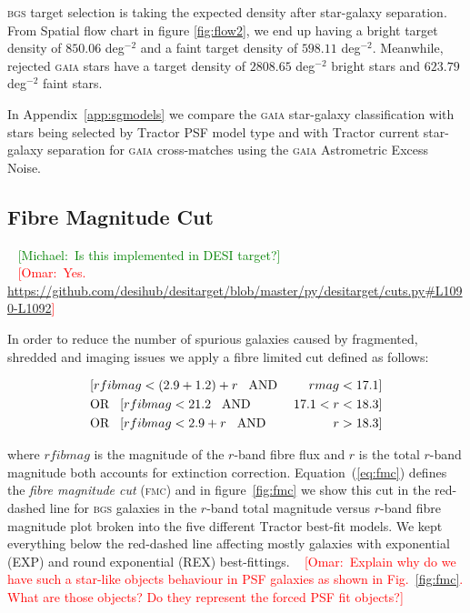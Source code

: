 \documentclass[fleqn,usenatbib]{mnras}
\newcommand{\mike}[1]{~\newline\noindent \textcolor{Green}{{ [Michael:~{#1}]\\}}}
\newcommand{\omar}[1]{~\newline\noindent \textcolor{red}{{ [Omar:~{#1}]\\}}}
\newcommand{\BGS}{\textsc{bgs}\xspace}
\newcommand{\FMC}{{\textsc{fmc}}\xspace}
\newcommand{\GAIA}{\textsc{gaia}\xspace}
\newcommand{\TRACTOR}{\textsc{T}ractor\xspace}
\begin{document}
\BGS target selection is taking the expected density after star-galaxy separation. From Spatial flow chart in figure \ref{fig:flow2}, we end up having a bright target density of $850.06$ deg$^{-2}$ and a faint target density of $598.11$ deg$^{-2}$. Meanwhile, rejected \GAIA stars have a target density of $2808.65$ deg$^{-2}$ bright stars and $623.79$ deg$^{-2}$ faint stars.

In Appendix~\ref{app:sgmodels} we compare the \GAIA star-galaxy classification with stars being selected by \TRACTOR PSF model type and with \TRACTOR current star-galaxy separation for \GAIA cross-matches using the \GAIA Astrometric Excess Noise.

\subsection{Fibre Magnitude Cut}
\mike{Is this implemented in DESI target?}
\omar{Yes. \url{https://github.com/desihub/desitarget/blob/master/py/desitarget/cuts.py\#L1090-L1092}}

In order to reduce the number of spurious galaxies caused by fragmented, shredded and imaging issues we apply a fibre limited cut defined as follows:


\begin{eqnarray}\label{eq:fmc}
    & [rfibmag < (2.9 + 1.2) + r  \hspace{3 mm} \text{AND} \hspace{1 mm} & rmag < 17.1 ] \nonumber \\
    & \text{OR} \hspace{3 mm} [rfibmag < 21.2 \hspace{3 mm} \text{AND} \hspace{1 mm} &17.1 < r < 18.3] \nonumber \\ 
    & \text{OR} \hspace{3 mm}  [rfibmag < 2.9 + r \hspace{3 mm} \text{AND} \hspace{1 mm} &r > 18.3]
\end{eqnarray}

where $rfibmag$ is the magnitude of the $r$-band fibre flux and $r$ is the total $r$-band magnitude both accounts for extinction correction. Equation~(\ref{eq:fmc}) defines the {\it fibre magnitude cut} (\FMC) and in figure~\ref{fig:fmc} we show this cut in the red-dashed line for \BGS galaxies in the $r$-band total magnitude versus $r$-band fibre magnitude plot broken into the five different \TRACTOR best-fit models. We kept everything below the red-dashed line affecting mostly galaxies with exponential (EXP) and round exponential (REX) best-fittings. 
\omar{Explain why do we have such a star-like objects behaviour in PSF galaxies as shown in Fig.~\ref{fig:fmc}. What are those objects? Do they represent the forced PSF fit objects?}
\end{document}
